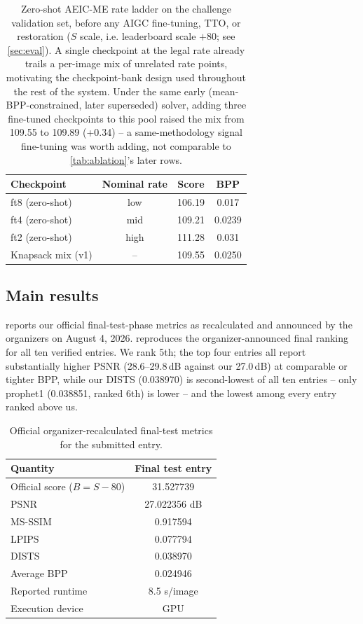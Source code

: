 \documentclass[runningheads]{llncs}
\begin{document}
\begin{table}[t]
\centering\footnotesize
\begin{tabular}{@{}lccc@{}}
\toprule
Checkpoint & Nominal rate & Score & BPP \\
\midrule
ft8 (zero-shot) & low & 106.19 & 0.017 \\
ft4 (zero-shot) & mid & 109.21 & 0.0239 \\
ft2 (zero-shot) & high & 111.28 & 0.031 \\
Knapsack mix (v1) & -- & 109.55 & 0.0250 \\
\bottomrule
\end{tabular}
\caption{Zero-shot AEIC-ME rate ladder on the challenge validation set, before any AIGC fine-tuning, TTO, or restoration ($S$ scale, i.e. leaderboard scale $+80$; see \cref{sec:eval}). A single checkpoint at the legal rate already trails a per-image mix of unrelated rate points, motivating the checkpoint-bank design used throughout the rest of the system. Under the same early (mean-BPP-constrained, later superseded) solver, adding three fine-tuned checkpoints to this pool raised the mix from 109.55 to 109.89 (+0.34) -- a same-methodology signal fine-tuning was worth adding, not comparable to \cref{tab:ablation}'s later rows.}
\label{tab:e1e3}
\end{table}

\subsection{Main results}
 reports our official final-test-phase metrics as recalculated and announced by the organizers on August 4, 2026.  reproduces the organizer-announced final ranking for all ten verified entries. We rank 5th; the top four entries all report substantially higher PSNR (28.6--29.8\,dB against our 27.0\,dB) at comparable or tighter BPP, while our DISTS (0.038970) is second-lowest of all ten entries -- only prophet1 (0.038851, ranked 6th) is lower -- and the lowest among every entry ranked above us.

\begin{table}[t]
\centering\small
\begin{tabular}{@{}lc@{}}
\toprule
Quantity & Final test entry \\
\midrule
Official score ($B{=}S{-}80$) & 31.527739 \\
PSNR & 27.022356 dB \\
MS-SSIM & 0.917594 \\
LPIPS & 0.077794 \\
DISTS & 0.038970 \\
Average BPP & 0.024946 \\
Reported runtime & 8.5 s/image \\
Execution device & GPU \\
\bottomrule
\end{tabular}
\caption{Official organizer-recalculated final-test metrics for the submitted entry.}
\label{tab:results}
\end{table}
\end{document}
